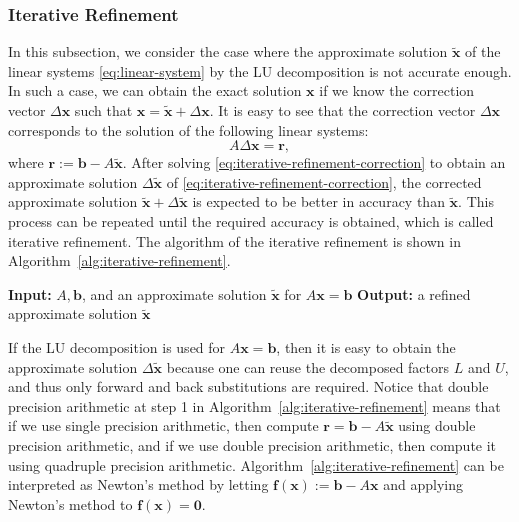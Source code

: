 \subsubsection{{Iterative Refinement}}\label{subsec:iterative-refinement}
{In this subsection, we consider the case where the approximate solution $\tilde{\bm x}$ of the linear systems \eqref{eq:linear-system} by the LU decomposition is not accurate enough.}
{In such a case, we can obtain the exact solution $\bm x$ if we know the correction vector $\Delta\bm x$ such that $\bm x=\tilde{\bm x}+\Delta\bm x$. It is easy to see that the correction vector $\Delta\bm x$ corresponds to the solution of the following linear systems:}
\begin{equation}\label{eq:iterative-refinement-correction}A\Delta\bm x=\bm r,\end{equation}
{where $\bm r:=\bm b-A\tilde{\bm x}$. After solving \eqref{eq:iterative-refinement-correction} to obtain an approximate solution $\Delta\tilde{\bm x}$ of \eqref{eq:iterative-refinement-correction}, the corrected approximate solution $\tilde{\bm x}+\Delta\tilde{\bm x}$ is expected to be better in accuracy than $\tilde{\bm x}$. This process can be repeated until the required accuracy is obtained, which is called iterative refinement. The algorithm of the iterative refinement is shown in Algorithm~\ref{alg:iterative-refinement}.}
\begin{algorithm}[H]
\caption{{Iterative refinement for $A\bm x=\bm b$}}\label{alg:iterative-refinement}
\begin{algorithmic}[1]
\Statex \textbf{Input:} $A,\bm b$, {and an approximate solution $\tilde{\bm x}$ for $A\bm x=\bm b$}
\Statex \textbf{Output:} {a refined approximate solution $\tilde{\bm x}$}
\end{algorithmic}
\end{algorithm}
{If the LU decomposition is used for $A\bm x=\bm b$, then it is easy to obtain the approximate solution $\Delta\tilde{\bm x}$ because one can reuse the decomposed factors $L$ and $U$, and thus only forward and back substitutions are required.}
{Notice that double precision arithmetic at step 1 in Algorithm~\ref{alg:iterative-refinement} means that if we use single precision arithmetic, then compute $\bm r=\bm b-A\tilde{\bm x}$ using double precision arithmetic, and if we use double precision arithmetic, then compute it using quadruple precision arithmetic.}
{Algorithm~\ref{alg:iterative-refinement} can be interpreted as Newton's method by letting $\bm f(\bm x):=\bm b-A\bm x$ and applying Newton's method to $\bm f(\bm x)=\bm0$.}
